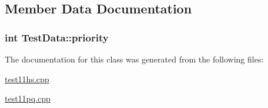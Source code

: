 \subsection{\-Member \-Data \-Documentation}
\hypertarget{class_test_data_a2aa3dc886a21401ecc0e6ee3c40d7342}{
\subsubsection[{priority}]{\setlength{\rightskip}{0pt plus 5cm}int {\bf \-Test\-Data\-::priority}}}\label{class_test_data_a2aa3dc886a21401ecc0e6ee3c40d7342}


\-The documentation for this class was generated from the following files\-:\begin{DoxyCompactItemize}
\item 
\hyperlink{test11hs_8cpp}{test11hs.\-cpp}\item 
\hyperlink{test11pq_8cpp}{test11pq.\-cpp}\end{DoxyCompactItemize}
